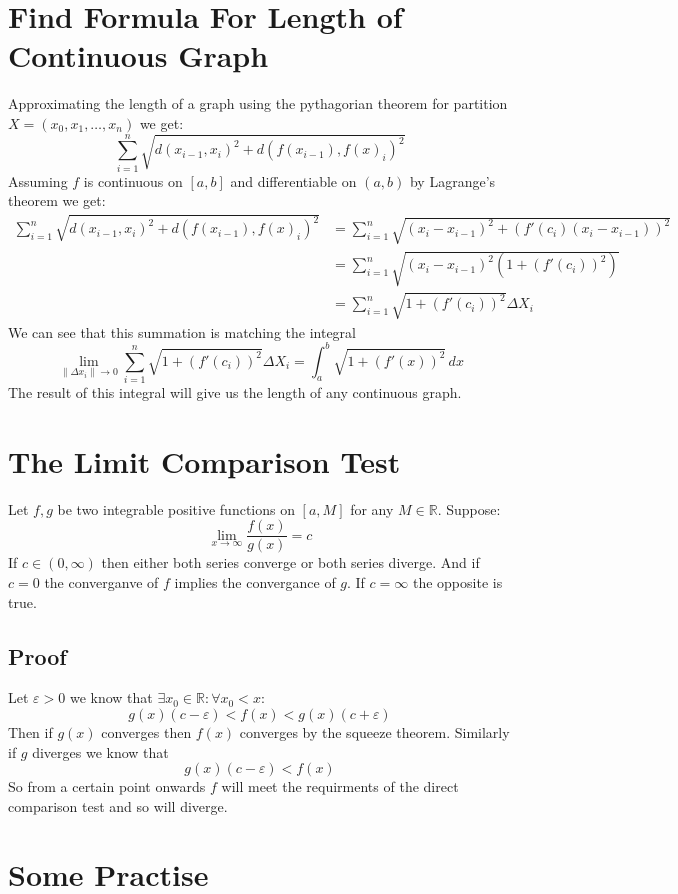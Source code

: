 \documentclass{article}
\newcommand{\R}{\mathbb{R}}
\begin{document}
	\section{Find Formula For Length of Continuous Graph}
	Approximating the length of a graph using the pythagorian theorem for partition
	$X=(x_0,x_1,\ldots,x_n)$ we get:
	\[
		\sum_{i=1}^{n}{\sqrt{d(x_{i-1}, x_i)^2 + d(f(x_{i-1}), f(x)_i)^2}}
	\]
	Assuming $f$ is continuous on $[a,b]$ and differentiable on $(a,b)$ by Lagrange's theorem we get:
	\begin{align*}
		\sum_{i=1}^{n}{\sqrt{d(x_{i-1}, x_i)^2 + d(f(x_{i-1}), f(x)_i)^2}}
		&= \sum_{i=1}^{n}{\sqrt{(x_i - x_{i-1})^2 + (f'(c_i)(x_{i} - x_{i-1}))^2}}\\
		&= \sum_{i=1}^{n}{\sqrt{(x_i - x_{i-1})^2(1 + (f'(c_i))^2)}} \\
		&= \sum_{i=1}^{n}{\sqrt{1 + (f'(c_i))^2}\Delta X_i}
	\end{align*}
	We can see that this summation is matching the integral
	\[
		\lim_{\|\Delta x_i\|\to 0}{\sum_{i=1}^{n}
		{\sqrt{1 + (f'(c_i))^2}\Delta X_i}} = 
		\int_a^b{\sqrt{1 + (f'(x))^2}\,dx}
	\]
	The result of this integral will give us the length of any continuous graph.
	
	\newpage
	
	\section{The Limit Comparison Test}
	Let $f, g$ be two integrable positive functions on $[a,M]$ for any $M \in \R$. 
	Suppose:
	\[
		\lim_{x\to\infty}{\frac{f(x)}{g(x)}} = c
	\]
	If $c \in (0,\infty)$ then either both series converge or both series diverge.
	And if $c=0$ the converganve of $f$ implies the convergance of $g$.
	If $c=\infty$ the opposite is true.
	
	\subsection{Proof}
	Let $\varepsilon > 0$ we know that $\exists x_0 \in \R \colon \forall x_0 < x$:
	\[
		g(x)(c-\varepsilon) < f(x) < g(x)(c+\varepsilon)
	\]
	Then if $g(x)$ converges then $f(x)$ converges by the squeeze theorem. 
	Similarly if $g$ diverges we know that
	\[
		g(x)(c-\varepsilon) < f(x)
	\]
	So from a certain point onwards $f$ will meet the requirments of the 
	direct comparison test and so will diverge.
	
	\newpage
	
	\section{Some Practise}
\end{document}

